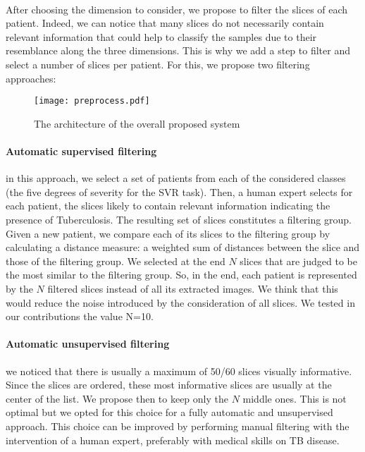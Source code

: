 \paragraph{}
After choosing the dimension to consider, we propose to filter the slices of each patient. Indeed, we can notice that many slices do not necessarily contain relevant information that could help to classify the samples due to their resemblance along the three dimensions. This is why we add a step to filter and select a number of slices per patient. For this, we propose two filtering approaches:
\begin{figure}[h!]
\texttt{[image: preprocess.pdf]}
\caption{The architecture of the overall proposed system} 
\label{fig:preprocess}
\end{figure}
\paragraph{Automatic supervised filtering}
in this approach, we select a set of patients from each of the considered classes (the five degrees of severity for the SVR task). Then, a human expert selects for each patient, the slices likely to contain relevant information indicating the presence of Tuberculosis. The resulting set of slices constitutes a filtering group. Given a new patient, we compare each of its slices to the filtering group by calculating a distance measure:  a weighted sum of distances between the slice and those of the filtering group. We selected at the end $N$ slices that are judged to be the most similar to the filtering group. So, in the end, each patient is represented by the $N$ filtered slices instead of all its extracted images. We think that this would reduce the noise introduced by the consideration of all slices. We tested in our contributions the value N=10.

\paragraph{Automatic unsupervised filtering}
we noticed that there is usually a maximum of 50/60 slices visually informative. Since the slices are ordered, these most informative slices are usually at the center of the list. We propose then to keep only the $N$ middle ones. This is not optimal but we opted for this choice for a fully automatic and unsupervised approach. This choice can be improved by performing manual filtering with the intervention of a human expert, preferably with medical skills on TB disease.

